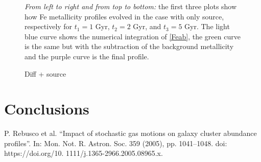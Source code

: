 \documentclass{article}
\begin{document}
\begin{figure}[H]
\begin{subfigure}{0.49\textwidth}
	\end{subfigure}
	\caption{\textit{From left to right and from top to bottom:} the first three plots show how Fe metallicity profiles evolved in the case with only source, respectively for $t_{1}=1 $ Gyr, $t_{2}=2$ Gyr, and $t_{3}=5$ Gyr. The light blue curve shows the numerical integration of \eqref{Feab}, the green curve is the same but with the subtraction of the background metallicity and the purple curve is the final profile.}
	\label{fig:Zsourceonly}
\end{figure}
\begin{figure}[H]
	\begin{subfigure}{0.49\textwidth}
		
	\end{subfigure}
	\begin{subfigure}{0.49\textwidth}
		
	\end{subfigure}
	\begin{subfigure}{0.49\textwidth}
		
	\end{subfigure}
	\begin{subfigure}{0.49\textwidth}
		
	\end{subfigure}
	\caption{Diff + source}
	\label{fig:Zdiffsource}
\end{figure}

\section*{Conclusions}



\begin{thebibliography}{1}
	P. Rebusco et al. “Impact of stochastic gas motions on galaxy cluster abundance profiles”.
In: Mon. Not. R. Astron. Soc. 359 (2005), pp. 1041–1048. doi: https://doi.org/10.
1111/j.1365-2966.2005.08965.x.
\end{thebibliography}
\end{document}
